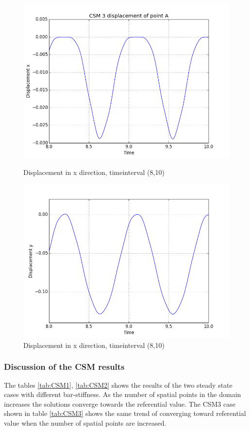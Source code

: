 \begin{figure}[H]
  \begin{minipage}[b]{0.60\linewidth}
    \centering
    \includegraphics[width=0.9\linewidth,trim={2mm 2mm 5mm 5mm},clip]{./Verification_Validation//Hron_Turek/dis_x_short.png} 
    \caption{Displacement in x direction, timeinterval (8,10)} 
    \vspace{4ex}
  \end{minipage}%
  \begin{minipage}[b]{0.60\linewidth}
    \centering
    \includegraphics[width=0.9\linewidth,trim={2mm 2mm 5mm 5mm},clip]{./Verification_Validation/Hron_Turek/dis_y_short.png} 
    \caption{Displacement in x direction, timeinterval (8,10)} 
    \vspace{4ex}
  \end{minipage} 
\end{figure}

\subsubsection*{Discussion of the CSM results}
The tables \ref{tab:CSM1}, \ref{tab:CSM2} shows the results of the two steady state cases with different bar-stiffness. As the number of spatial points in the domain increases the solutions converge towards the referential value. The CSM3 case shown in table \ref{tab:CSM3} shows the same trend of converging toward referential value when the number of spatial points are increased.

